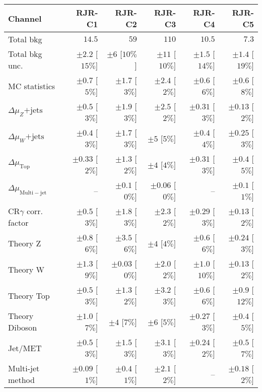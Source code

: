\begin{table}[H]
\begin{center}
\begin{tabular}{|lrrrrr|}
\hline
Channel  & \textbf{ RJR-C1 } & \textbf{ RJR-C2 } & \textbf{ RJR-C3 } & \textbf{ RJR-C4 } & \textbf{ RJR-C5 } \\ \hline
Total bkg  &  $14.5$  &  $59$  &  $110$  &  $10.5$  &  $7.3$ \\
Total bkg unc.  &  $\pm 2.2$  [$15\%$]  &  $\pm 6$  [$10\%$]  &  $\pm 11$  [$10\%$]  &  $\pm 1.5$  [$14\%$]  &  $\pm 1.4$  [$19\%$] \\
\hline
MC statistics  &  $\pm 0.7$ [$5\%$]  &  $\pm 1.7$ [$3\%$]  &  $\pm 2.4$ [$2\%$]  &  $\pm 0.6$ [$6\%$]  &  $\pm 0.6$ [$8\%$] \\
$\Delta\mu_Z\mathrm{+jets}$  &  $\pm 0.5$ [$3\%$]  &  $\pm 1.9$ [$3\%$]  &  $\pm 2.5$ [$2\%$]  &  $\pm 0.31$ [$3\%$]  &  $\pm 0.13$ [$2\%$] \\
$\Delta\mu_W\mathrm{+jets}$ &  $\pm 0.4$ [$3\%$]  &  $\pm 1.7$ [$3\%$]  &  $\pm 5$ [$5\%$]  &  $\pm 0.4$ [$4\%$]  &  $\pm 0.25$ [$3\%$] \\
$\Delta\mu_\mathrm{ Top}$  &  $\pm 0.33$ [$2\%$]  &  $\pm 1.3$ [$2\%$]  &  $\pm 4$ [$4\%$]  &  $\pm 0.31$ [$3\%$]  &  $\pm 0.4$ [$5\%$] \\
$\Delta\mu_\mathrm{ Multi-jet}$  &  --  &  $\pm 0.1$ [$0\%$]  &  $\pm 0.06$ [$0\%$]  &   --    &  $\pm 0.1$ [$1\%$] \\
CR$\gamma$ corr. factor  &  $\pm 0.5$ [$3\%$]  &  $\pm 1.8$ [$3\%$]  &  $\pm 2.3$ [$2\%$]  &  $\pm 0.29$ [$3\%$]  &  $\pm 0.13$ [$2\%$] \\
Theory Z  &  $\pm 0.8$ [$6\%$]  &  $\pm 3.5$ [$6\%$]  &  $\pm 4$ [$4\%$]  &  $\pm 0.6$ [$6\%$]  &  $\pm 0.24$ [$3\%$] \\
Theory W  &  $\pm 1.3$ [$9\%$]  &  $\pm 0.03$ [$0\%$]  &  $\pm 2.0$ [$2\%$]  &  $\pm 1.0$ [$10\%$]  &  $\pm 0.13$ [$2\%$] \\
Theory Top   &  $\pm 0.5$ [$3\%$]  &  $\pm 1.3$ [$2\%$]  &  $\pm 3.2$ [$3\%$]  &  $\pm 0.6$ [$6\%$]  &  $\pm 0.9$ [$12\%$] \\
Theory Diboson  &  $\pm 1.0$ [$7\%$]  &  $\pm 4$ [$7\%$]  &  $\pm 6$ [$5\%$]  &  $\pm 0.27$ [$3\%$]  &  $\pm 0.4$ [$5\%$] \\
Jet/MET   &  $\pm 0.5$ [$3\%$]  &  $\pm 1.5$ [$3\%$]  &  $\pm 3.1$ [$3\%$]  &  $\pm 0.24$ [$2\%$]  &  $\pm 0.5$ [$7\%$] \\
Multi-jet method  &  $\pm 0.09$ [$1\%$]  &  $\pm 0.4$ [$1\%$]  &  $\pm 2.1$ [$2\%$]  &   --    &  $\pm 0.18$ [$2\%$] \\
\hline
\end{tabular}


\end{center}
\end{table}
